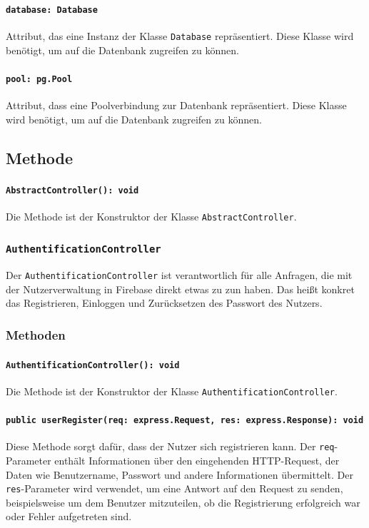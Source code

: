 \documentclass{entwurfsheft}
\begin{document}
\paragraph{\texttt{database: Database}}
Attribut, das eine Instanz der Klasse \texttt{Database} repräsentiert. Diese Klasse wird benötigt, um auf die Datenbank zugreifen zu können.
\paragraph{\texttt{pool: pg.Pool}}
Attribut, dass eine Poolverbindung zur Datenbank repräsentiert. Diese Klasse wird benötigt, um auf die Datenbank zugreifen zu können.
\subsection*{Methode}
\paragraph{\texttt{AbstractController(): void}}
Die Methode ist der Konstruktor der Klasse \texttt{AbstractController}.

\subsubsection{\texttt{AuthentificationController}}\label{sec:AuthentificationController}
Der \texttt{AuthentificationController} ist verantwortlich für alle Anfragen, die mit der Nutzerverwaltung in Firebase direkt etwas zu zun haben. Das heißt konkret das Registrieren, Einloggen und Zurücksetzen des Passwort des Nutzers.
\subsubsection*{Methoden}
\paragraph{\texttt{AuthentificationController(): void}}
Die Methode ist der Konstruktor der Klasse \texttt{AuthentificationController}.
\paragraph{\texttt{public userRegister(req: express.Request, res: express.Response): void}}
Diese Methode sorgt dafür, dass der Nutzer sich registrieren kann. Der \texttt{req}-Parameter enthält Informationen über den eingehenden HTTP-Request, der Daten wie Benutzername, Passwort und andere Informationen übermittelt. Der \texttt{res}-Parameter wird verwendet, um eine Antwort auf den Request zu senden, beispielsweise um dem Benutzer mitzuteilen, ob die Registrierung erfolgreich war oder Fehler aufgetreten sind.
\end{document}
